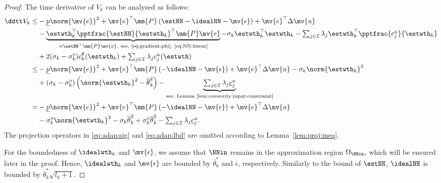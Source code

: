 \documentclass[letterpaper, journal, twoside]{IEEEtran}
\begin{document}
\begin{proof}
The time derivative of $V_{k}$ can be analyzed as follows:
\begin{align} \label{eq:Vk:dot:1} \nonumber
  \ddtt V_{k}
  \le&
  -\underline{p}
  \norm{\mv{e}}^2
  +
  \mv{e}^\top\mm{P}
  \left(
    \estNN - \idealNN
    - \mv{\epsilon}
  \right)
  +
  \mv{e}^\top
  \Delta \mv{u}
  \\ \nonumber
  &
  -
  \underbrace{
    \estwth_k^\top
    \pptfrac{\estNN}{\estwth_k}^\top
    \mm{P}
    \mv{e}
  }_{
    = 
    \estNN^\top\mm{P}\mv{e}
    ,\ \text{see, \eqref{eq:gradient:phi}, \eqref{eq:NN:linear}}
  }
  -
  \sigma_k
  \estwth_k^\top
  \estwth_k
  -    
  \textstyle\sum_{j\in\mathcal{I}}
  \lambda_j
  \estwth_k^\top
  \pptfrac{c^{u}_j}{\estwth_k}
  \\ %
  &
  +
  2(\sigma_k-\sigma_k^o) c_k^{\theta}(\estwth_k)
  +
  \textstyle\sum_{j\in\mathcal{I}}
  \lambda_j c^{u}_j(\estwth)
  \\ \nonumber
  \le&
  -\underline{p}
  \norm{\mv{e}}^2
  +
  \mv{e}^\top
  \mm{P}
  \left(
    - \idealNN
    - \mv{\epsilon}
  \right)
  +
  \mv{e}^\top
  \Delta \mv{u}
  -
  \sigma_k \norm{\estwth_k}^2
  \\ \nonumber
  &
  +
  (\sigma_k-\sigma_k^o) 
  \left(
    \norm{\estwth_k}^2
    -
    \overline{\theta}_k^{2}
  \right)
  -
  \underbrace{
    \textstyle\sum_{j\in\mathcal{I}}
    \lambda_j
    \underline{c}_j^u 
  }_{\text{see, Lemma~\ref{lem:convexity:input:constraint}}}
  \\ \nonumber
  =&
  -\underline{p}
  \norm{\mv{e}}^2
  +
  \mv{e}^\top
  \mm{P}
  \left(
    - \idealNN
    - \mv{\epsilon}
  \right)
  +
  \mv{e}^\top
  \Delta \mv{u}
  \\ \nonumber
  &
  -
  \sigma_k^o
  \norm{\estwth_k}^2
  -
  \sigma_k
  \overline{\theta}_k^2
  +
  \sigma_k^o
  \overline{\theta}_k^2
  -
  \textstyle\sum_{j\in\mathcal{I}}
  \lambda_j
  \underline{c}_j^u 
  .
\end{align}
The projection operators in \eqref{eq:adap:sig} and \eqref{eq:adap:lbd} are omitted according to Lemma~\ref{lem:proj:ineq}.

For the boundedness of $\idealwth_k$ and $\mv{\epsilon}$, we assume that $\NNin$ remains in the approximation region $\Omega_{\NNin}$, which will be ensured later in the proof.
Hence, $\idealwth_k$ and $\mv{\epsilon}$ are bounded by $\overline{\theta}_k^*$ and $\overline{\epsilon}$, respectively.
Similarly to the bound of $\estNN$, $\idealNN$ is bounded by $\overline{\theta}_k^* \sqrt{l_k+1}$.


\end{proof}
\end{document}
